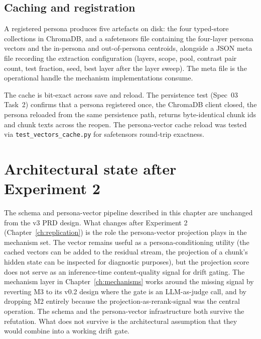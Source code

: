 \subsection{Caching and registration}

A registered persona produces five artefacts on disk: the four typed-store collections in ChromaDB, and a safetensors file containing the four-layer persona vectors and the in-persona and out-of-persona centroids, alongside a JSON meta file recording the extraction configuration (layers, scope, pool, contrast pair count, test fraction, seed, best layer after the layer sweep). The meta file is the operational handle the mechanism implementations consume.

The cache is bit-exact across save and reload. The persistence test (Spec~03 Task~2) confirms that a persona registered once, the ChromaDB client closed, the persona reloaded from the same persistence path, returns byte-identical chunk ids and chunk texts across the reopen. The persona-vector cache reload was tested via \texttt{test\_vectors\_cache.py} for safetensors round-trip exactness.

\section{Architectural state after Experiment 2}
\label{sec:architecture-after-experiment-2}

The schema and persona-vector pipeline described in this chapter are unchanged from the v3 PRD design. What changes after Experiment 2 (Chapter~\ref{ch:replication}) is the role the persona-vector projection plays in the mechanism set. The vector remains useful as a persona-conditioning utility (the cached vectors can be added to the residual stream, the projection of a chunk's hidden state can be inspected for diagnostic purposes), but the projection score does not serve as an inference-time content-quality signal for drift gating. The mechanism layer in Chapter~\ref{ch:mechanisms} works around the missing signal by reverting M3 to its v0.2 design where the gate is an LLM-as-judge call, and by dropping M2 entirely because the projection-as-rerank-signal was the central operation. The schema and the persona-vector infrastructure both survive the refutation. What does not survive is the architectural assumption that they would combine into a working drift gate.
